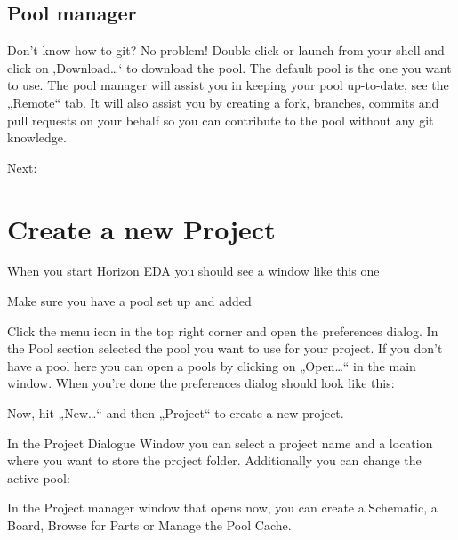\documentclass[letterpaper,10pt,czech]{sphinxmanual}
\begin{document}
\section{Pool manager}
\label{\detokenize{pool-setup:pool-manager}}
Don’t know how to git? No problem! Double-click  or
launch  from your shell and click on ‚Download…‘ to
download the pool. The default pool  is
the one you want to use. The pool manager will assist you in keeping
your pool up-to-date, see the „Remote“ tab. It will also assist you by
creating a fork, branches, commits and pull requests on your behalf so
you can contribute to the pool without any git knowledge.

Next: {\hyperref[\detokenize{new-project::doc}]{}}


\chapter{Create a new Project}
\label{\detokenize{new-project:create-a-new-project}}\label{\detokenize{new-project::doc}}
When you start Horizon EDA you should see a window like this one

\noindent{}

Make sure you have a pool set up and added

Click the menu icon in the top right corner and open the
preferences dialog. In the Pool section selected the pool you want to use for your project. If you don’t have a pool here you can open a pools  by clicking on „Open…“ in the main window. When you’re done the
preferences dialog should look like this:

\noindent{}

Now, hit „New…“ and then „Project“ to create a new project.

In the Project Dialogue Window you can select a project name and a location where you want to store the project folder. Additionally you can change the active pool:

\noindent{}

In the Project manager window that opens now, you can create a Schematic, a Board, Browse for Parts or Manage the Pool Cache.

\noindent{}
\end{document}
